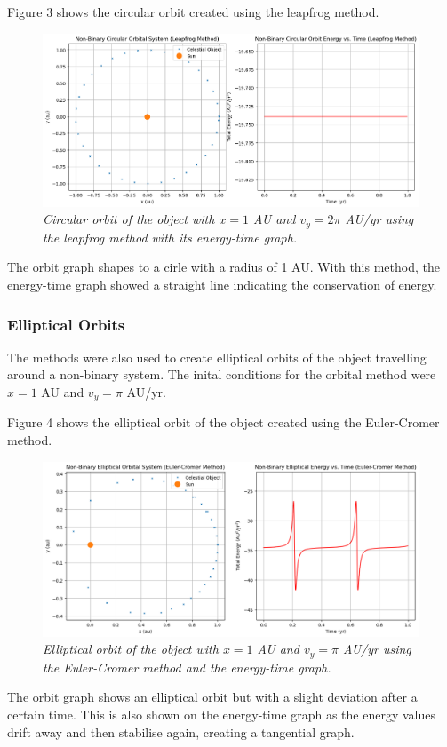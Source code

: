 \documentclass[11 pt, a4paper]{article}
\begin{document}
Figure 3 shows the circular orbit created using the leapfrog method.
\begin{figure}[H]
  \includegraphics[width=1\linewidth]{Leapfrog/leapfrogcircular.png}
  \centering
  \caption{\textit{Circular orbit of the object with $x = 1$ AU and $v_y = 2\pi$ AU/yr using the leapfrog method with its energy-time graph.}}
\end{figure}
The orbit graph shapes to a cirle with a radius of 1 AU. With this method, the energy-time graph showed a straight line indicating the conservation of energy.

\subsubsection{Elliptical Orbits}
The methods were also used to create elliptical orbits of the object travelling around a non-binary system. The inital conditions for the orbital method
were $x=1$ AU and $v_y = \pi$ AU/yr.

Figure 4 shows the elliptical orbit of the object created using the Euler-Cromer method.
\begin{figure}[H]
  \includegraphics[width=1\linewidth]{Euler cromer/eulercromerelliptic.png}
  \centering
  \caption{\textit{Elliptical orbit of the object with $x = 1$ AU and $v_y = \pi$ AU/yr using the Euler-Cromer method and the energy-time graph.}} 
\end{figure}
The orbit graph shows an elliptical orbit but with a slight deviation after a certain time. This is also shown on the energy-time graph as the energy values drift away and then stabilise again, creating a tangential graph.
\end{document}
